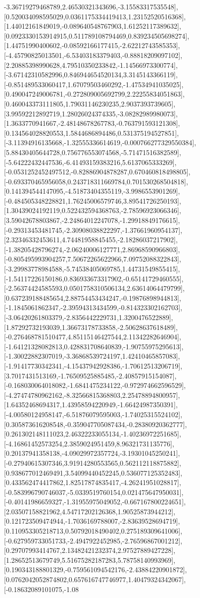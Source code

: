 \documentclass{article}
\begin{document}
-3.36719279468789,2.46530321343696,-3.15583317535548],[0.520034098595029,0.0361175334419413,1.23152520516368],[1.44012161849019,-0.089640548767903,1.61252117389632],[0.0923330153914915,0.511789108794469,0.839234505698274],[1.44751990400602,-0.08592166177415,-2.62212743585353],[-4.45790825013501,-6.53403183379403,-0.88818209097102],[2.20885398990628,4.79510350233842,-1.14566973300774],[-3.67142310582996,0.846944654520134,3.3145143366119],[-0.851489533060417,1.67079503460292,-1.47534941035025],[0.490047249006781,-0.272809005692799,2.22255834051863],[0.460043373111805,1.79031146230235,2.9037393739605],[3.99592212892719,1.28026024374335,-3.08282989980073],[1.3633770941667,-2.48148678267783,-0.763791593121308],[0.134564028820553,1.5844686894486,0.531375194527851],[-3.11394916135668,-1.32555336614619,-0.000766277329550384],[5.88430405644728,0.756776553074568,-5.71471516382589],[-5.64222432447536,-6.41493159383216,5.6137065333269],[-0.0531252452497512,-0.82886904878287,0.670460818498805],[-0.693370465956058,0.243718311669784,0.701530268504818],[0.141394544147095,-4.51873404355119,-3.9986553901269],[-0.484505348228821,1.76245006579746,3.89541726250193],[1.30439024192119,0.522432594368763,-2.78596923066346],[3.59042678803867,-2.24864012247078,-1.29918849176615],[-0.29313453481745,-2.30908038822297,-1.37661960954137],[2.32346332453611,4.74481958845455,-2.18286037217902],[-1.38205428796274,-2.06240006127771,2.86968590966803],[-0.805495993904257,7.50672265622966,7.09752088322843],[-3.29983778984588,-5.74538405069785,1.44731549855415],[-1.54117226150186,0.836933673317902,-0.65141729460555],[-2.56374424585593,0.0501758310506134,2.63614064479799],[0.637239188485654,2.88754453434247,-0.19876898944813],[-1.1845061862347,-2.39594313434599,-0.814323302162703],[-3.06420261803379,-2.8356442229731,1.3200476522889],[1.87292732193039,1.36673178733858,-2.50628637618489],[-0.276468781510477,4.85115146427544,2.11342282646904],[-1.64121328082813,0.428831708640839,-1.90755975295613],[-1.30022882307019,-3.36868539724197,1.42410465857083],[-1.91417730342341,-4.15437942928386,-1.70612513206719],[3.7017431513169,-1.76509525885485,-2.40857915154087],[-0.168030064018082,-1.6841475234122,-0.972974662596529],[-4.27474780962162,-8.32566815368803,2.25478894800957],[1.64352468694317,1.43958594220949,-1.66424987350391],[-4.00580124958147,-6.51876079595003,-1.74025315524102],[0.305873616208548,-0.359047705087434,-0.28380920362777],[0.261302148111023,2.46322233055134,-1.40236972251685],[-4.16861452573254,2.3859024951459,8.96321731135776],[0.20137941358138,-4.09029972357724,-3.19301045250241],[-0.27940615307346,3.91914280553565,0.562112118875882],[0.938677012469491,3.54099440452245,0.536077125352483],[0.433562474417862,1.82517874835417,-4.26241951028817],[-0.583996790746037,-5.0339519760154,0.021475647950031],[-0.40141986659327,-1.31955975049052,-0.667167800224651],[2.03507158821962,4.54717202126368,1.90525873944212],[0.121723509474944,-1.7036169788007,-2.83639528694719],[0.110953305218713,0.50792018490402,0.275189309641006],[-0.627959733051733,-2.4947922452985,-2.76596867001212],[0.29707993414767,2.13482421232374,2.97527889427228],[1.28652513679749,5.51675282187283,5.78758140993969],[0.190343188801329,-0.759561094542176,-2.43884220901872],[0.0762042052874802,0.657616747746977,1.40479324342067],[-0.18632089101075,-1.08
\end{document}

